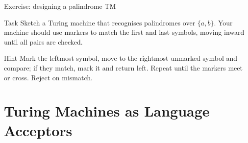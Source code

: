 \begin{frame}[t]{Exercise: designing a palindrome TM}
  \begin{tblock}{Task}
    Sketch a Turing machine that recognises palindromes over
    $\{a,b\}$.  Your machine should use markers to match the first and
    last symbols, moving inward until all pairs are checked.
  \end{tblock}
  \begin{talert}{Hint}
    Mark the leftmost symbol, move to the rightmost unmarked symbol
    and compare; if they match, mark it and return left.  Repeat
    until the markers meet or cross.  Reject on mismatch.
  \end{talert}
  \label{fr:7.2-20}
\end{frame}

%

\section{Turing Machines as Language Acceptors}


